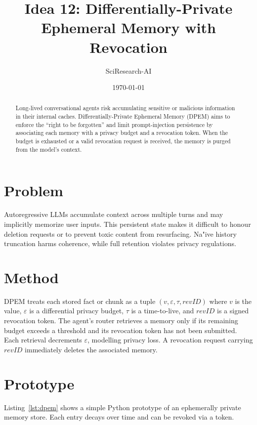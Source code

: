 \documentclass{article}
\title{Idea 12: Differentially-Private Ephemeral Memory with Revocation}
\author{SciResearch-AI}
\date{\today}
\begin{document}
\maketitle

\begin{abstract}
Long-lived conversational agents risk accumulating sensitive or malicious
information in their internal caches.  Differentially-Private Ephemeral
Memory (DPEM) aims to enforce the ``right to be forgotten'' and limit
prompt‑injection persistence by associating each memory with a privacy budget
and a revocation token.  When the budget is exhausted or a valid
revocation request is received, the memory is purged from the model's
context.
\end{abstract}

\section{Problem}
Autoregressive LLMs accumulate context across multiple turns and may
implicitly memorize user inputs.  This persistent state makes it
difficult to honour deletion requests or to prevent toxic content from
resurfacing.  Na{"i}ve history truncation harms coherence, while full
retention violates privacy regulations.

\section{Method}
DPEM treats each stored fact or chunk as a tuple $(v,\varepsilon,\tau,
\mathit{revID})$ where $v$ is the value, $\varepsilon$ is a
differential privacy budget, $\tau$ is a time-to-live, and
$\mathit{revID}$ is a signed revocation token.  The agent's router
retrieves a memory only if its remaining budget exceeds a threshold
and its revocation token has not been submitted.  Each retrieval
decrements $\varepsilon$, modelling privacy loss.  A revocation
request carrying $\mathit{revID}$ immediately deletes the associated
memory.

\section{Prototype}
Listing~\ref{lst:dpem} shows a simple Python prototype of an
ephemerally private memory store.  Each entry decays over time and
can be revoked via a token.
\end{document}
